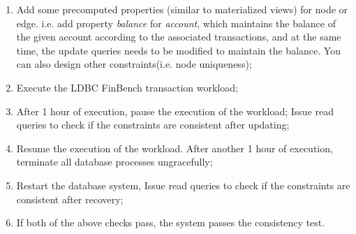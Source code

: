 \begin{enumerate}[label={(\roman*)}]
  \item Add some precomputed properties (similar to materialized views) for node
        or edge. i.e. add property \emph{balance} for \emph{account}, which 
        maintains the balance of the given account according to the associated 
        transactions, and at the same time, the update queries needs to be modified
        to maintain the balance. You can also design other constraints(i.e. node 
        uniqueness);
  \item Execute the LDBC FinBench transaction workload;
  \item After 1 hour of execution, pause the execution of the workload;
        Issue read queries to check if the constraints are consistent after 
        updating;
  \item Resume the execution of the workload. After another 1 hour of execution,
        terminate all database processes ungracefully;
  \item Restart the database system, Issue read queries to check if the 
        constraints are consistent after recovery;
  \item If both of the above checks pass, the system passes the 
        consistency test.
\end{enumerate}
